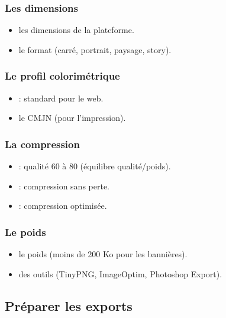 \subsubsection{Les dimensions}

\begin{itemize}
    \item {} les dimensions de la plateforme.
    \item {} le format (carré, portrait, paysage, story).
\end{itemize}

\subsubsection{Le profil colorimétrique}

\begin{itemize}
    \item {} : standard pour le web.
    \item {} le CMJN (pour l'impression).
\end{itemize}

\subsubsection{La compression}

\begin{itemize}
    \item {} : qualité 60 à 80 (équilibre qualité/poids).
    \item {} : compression sans perte.
    \item {} : compression optimisée.
\end{itemize}

\subsubsection{Le poids}

\begin{itemize}
    \item {} le poids (moins de 200 Ko pour les bannières).
    \item {} des outils (TinyPNG, ImageOptim, Photoshop Export).
\end{itemize}

\subsection{Préparer les exports}

